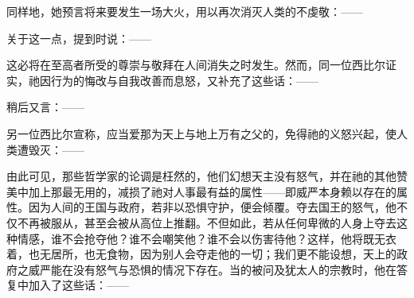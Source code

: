 同样地，她预言将来要发生一场大火，用以再次消灭人类的不虔敬：——\par

\par

关于这一点，提到时说：——\par

\par

这必将在至高者所受的尊崇与敬拜在人间消失之时发生。然而，同一位西比尔证实，祂因行为的悔改与自我改善而息怒，又补充了这些话：——\par

\par

稍后又言：——\par

\par

另一位西比尔宣称，应当爱那为天上与地上万有之父的，免得祂的义怒兴起，使人类遭毁灭：——\par

\par

由此可见，那些哲学家的论调是枉然的，他们幻想天主没有怒气，并在祂的其他赞美中加上那最无用的，减损了祂对人事最有益的属性——即威严本身赖以存在的属性。因为人间的王国与政府，若非以恐惧守护，便会倾覆。夺去国王的怒气，他不仅不再被服从，甚至会被从高位上推翻。不但如此，若从任何卑微的人身上夺去这种情感，谁不会抢夺他？谁不会嘲笑他？谁不会以伤害待他？这样，他将既无衣着，也无居所，也无食物，因为别人会夺走他的一切；我们更不能设想，天上的政府之威严能在没有怒气与恐惧的情况下存在。当的被问及犹太人的宗教时，他在答复中加入了这些话：——\par

\par

